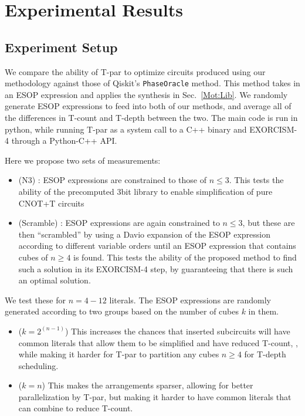 \section{Experimental Results}
\label{Exp}
\subsection{Experiment Setup}
\label{Exp:Set}
We compare the ability of T-par to optimize circuits produced using our methodology against those of
Qiskit's \texttt{PhaseOracle} method. This method takes in an ESOP expression and applies the synthesis in
Sec.~\ref{Mot:Lib}. We randomly generate ESOP expressions to feed into both of our methods, and average all
of the differences in T-count and T-depth between the two. The main code is run in python, while running
T-par as a system call to a C++ binary and EXORCISM-4 through a Python-C++ API.

Here we propose two sets of measurements:

\begin{itemize}
\item (N3) : ESOP expressions are constrained to those of $n \leq 3$. This tests the ability of the
  precomputed 3bit library to enable simplification of pure CNOT+T circuits
\item (Scramble) : ESOP expressions are again constrained to $n \leq 3$, but these are then ``scrambled''
  by using a Davio expansion of the ESOP expression according to different variable orders until an ESOP expression
  that contains cubes of $n \geq 4$ is found. This tests the ability of the proposed method to find such a
  solution in its EXORCISM-4 step, by guaranteeing that there is such an optimal solution.
\end{itemize}

We test these for $n=4-12$ literals. The ESOP expressions are randomly generated according to two groups
based on the number of cubes $k$ in them.

\begin{itemize}
\item ($k=2^(n-1)$) This increases the chances that inserted subcircuits will have common literals that allow them
  to be simplified and have reduced T-count, , while making it harder for T-par to partition any cubes $n \geq 4$
  for T-depth scheduling.
\item ($k=n$) This makes the arrangements sparser, allowing for better parallelization by T-par, but making
  it harder to have common literals that can combine to reduce T-count.
\end{itemize}

